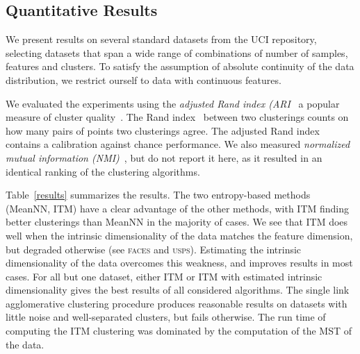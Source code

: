 \subsection{Quantitative Results}
We present results on several standard datasets from the UCI repository, 
selecting datasets that span a wide range of combinations of number
of samples, features and clusters.
To satisfy the assumption of absolute continuity of the data distribution, 
we restrict ourself to data with continuous features.

We evaluated the experiments using the \emph{adjusted Rand index 
(ARI}~\citep{hubert1985comparing} a popular measure
of cluster quality~\citep{gomes2010discriminative,kamvar2003spectral}.
The Rand index~\citep{rand1971objective} between two clusterings counts on how
many pairs of points two clusterings agree. The adjusted Rand index contains a
calibration against chance performance.
We also measured \emph{normalized mutual information
(NMI)}~\citep{strehl2003cluster}, but do not report it here, as it resulted in
an identical ranking of the clustering algorithms.

Table~\ref{results} summarizes the results. The two entropy-based methods 
(MeanNN, ITM) have a clear advantage of the other methods, with ITM finding 
better clusterings than MeanNN in the majority of cases.
We see that ITM does well when the intrinsic dimensionality of the data matches
the feature dimension, but degraded otherwise (see \textsc{faces} and \textsc{usps}).
Estimating the intrinsic dimensionality of the data overcomes this weakness,
and improves results in most cases. For all but one dataset, either ITM or ITM with
estimated intrinsic dimensionality gives the best results of all considered
algorithms.
%
The single link agglomerative clustering procedure produces reasonable 
results on datasets with little noise and well-separated clusters, but 
fails otherwise.
%
The run time of computing the ITM clustering was dominated by the computation
of the MST of the data.
%

